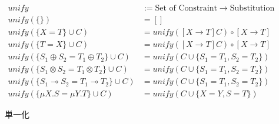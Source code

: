 \documentclass{jsarticle}
\begin{document}
\begin{figure}[H]
  \begin{align*}
    unify    &:= \text{Set of Constraint} \rightarrow \text{Substitution} \\
    unify(\{\})             &= [] \\
    unify(\{X = T\} \cup C) &= unify([X \rightarrow T]C) \circ [X \rightarrow T] \\
    unify(\{T = X\} \cup C) &= unify([X \rightarrow T]C) \circ [X \rightarrow T] \\
    unify(\{S_1 \oplus S_2 = T_1 \oplus T_2\} \cup C) &= unify(C \cup \{S_1 = T_1, S_2 = T_2\}) \\
    unify(\{S_1 \otimes S_2 = T_1 \otimes T_2\} \cup C) &= unify(C \cup \{S_1 = T_1, S_2 = T_2\}) \\
    unify(\{S_1 \multimap S_2 = T_1 \multimap T_2\} \cup C) &= unify(C \cup \{S_1 = T_1, S_2 = T_2\}) \\
    unify(\{\mu{X}.S = \mu{Y}.T\} \cup C) &= unify(C \cup \{X = Y, S = T\})
  \end{align*}
  \caption{単一化}
  \label{fig:unification}
\end{figure}
\end{document}
